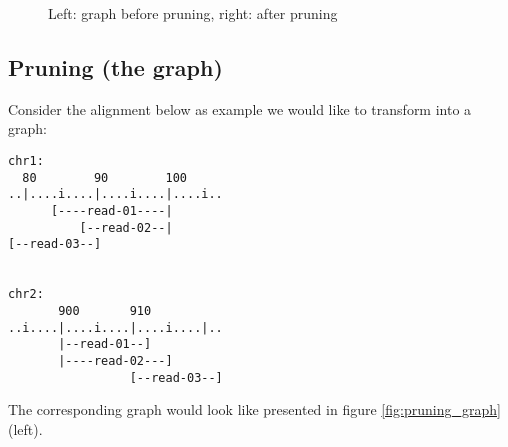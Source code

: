 \documentclass{article}
\theoremstyle{definition}
\begin{document}
\begin{figure}
\caption{Left: graph before pruning, right: after pruning}
\label{fig:edges_clips}
\end{figure}

\clearpage


\subsection{Pruning (the graph)}
Consider the alignment below as example we would like to transform into a graph:
\begin{verbatim}
chr1:
  80        90        100
..|....i....|....i....|....i..
      [----read-01----|
          [--read-02--|
[--read-03--]


chr2:      
       900       910
..i....|....i....|....i....|..
       |--read-01--]
       |----read-02---]
                 [--read-03--]
\end{verbatim}
The corresponding graph would look like presented in figure \ref{fig:pruning_graph} (left).
\end{document}
